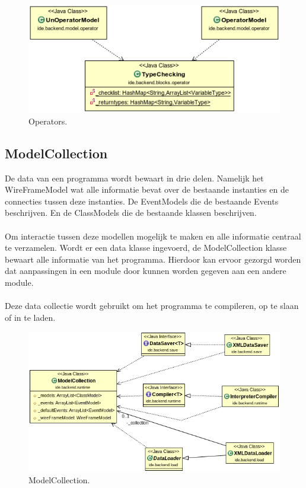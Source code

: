 \documentclass[]{article}
\begin{document}
\begin{figure}[H]
  \centering
\includegraphics[scale=0.4]{AnalyseADTAlgorithm/blockmodel/operatorType}
  \caption{Operators.} \label{Operators}
\end{figure}

\subsection{ModelCollection}
\label{ModelCollection}
De data van een programma wordt bewaart in drie delen. Namelijk het WireFrameModel wat alle informatie bevat over de bestaande instanties en de connecties tussen deze instanties. De EventModels die de bestaande Events beschrijven. En de ClassModels die de bestaande klassen beschrijven. \\\\
Om interactie tussen deze modellen mogelijk te maken en alle informatie centraal te verzamelen. Wordt er een data klasse ingevoerd, de ModelCollection klasse bewaart alle informatie van het programma. Hierdoor kan ervoor gezorgd worden dat aanpassingen in een module door kunnen worden gegeven aan een andere module.\\\\
Deze data collectie wordt gebruikt om het programma te compileren, op te slaan of in te laden.
\begin{figure}[H]
  \centering
\includegraphics[scale=0.4]{AnalyseADTAlgorithm/ModelCollection/ModelCollection.png}
  \caption{ModelCollection.} \label{modelCollectionImage}
\end{figure}
\end{document}
